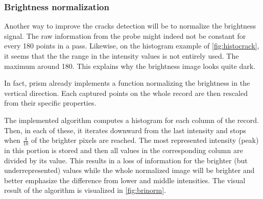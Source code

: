\subsubsection{Brightness normalization}
\label{sec:brinorm}

Another way to improve the cracks detection will be to normalize the brightness signal. The raw information from the probe might indeed not be constant for every 180 points in a pass. Likewise, on the histogram example of \autoref{fig:histocrack}, it seems that the the range in the intensity values is not entirely used. The maximum around 180. This explains why the brightness image looks quite dark.

In fact, \gls{prism} already implements a function normalizing the brightness in the vertical direction. Each captured points on the whole record are then rescaled from their specific properties.

The implemented algorithm computes a histogram for each column of the record. Then, in each of these, it iterates downward from the last intensity and stops when $\frac{4}{10}$ of the brighter pixels are reached. The most represented intensity (peak) in this portion is stored and then all values in the corresponding column are divided by its value. This results in a loss of information for the brighter (but underrepresented) values while the whole normalized image will be brighter and better emphasize the difference from lower and middle intensities. The visual result of the algorithm is visualized in \autoref{fig:brinorm}.


